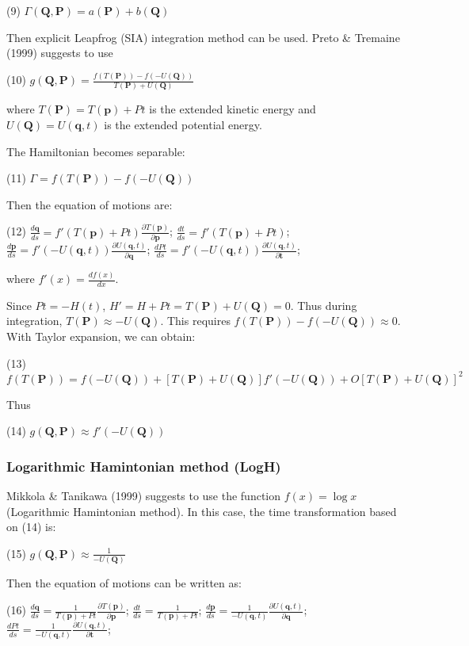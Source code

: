 (9) $ \Gamma(\mathbf{Q},\mathbf{P}) = a(\mathbf{P}) + b(\mathbf{Q}) $

Then explicit Leapfrog (S\+IA) integration method can be used. Preto \& Tremaine (1999) suggests to use

(10) $ g(\mathbf{Q},\mathbf{P}) = \frac{f(T(\mathbf{P})) - f(-U(\mathbf{Q}))}{T(\mathbf{P}) + U(\mathbf{Q})} $

where $ T(\mathbf{P}) = T(\mathbf{p}) + Pt $ is the extended kinetic energy and $ U(\mathbf{Q}) = U(\mathbf{q},t) $ is the extended potential energy.

The Hamiltonian becomes separable\+:

(11) $ \Gamma = f(T(\mathbf{P})) - f(-U(\mathbf{Q})) $

Then the equation of motions are\+:

(12) $ \frac{d \mathbf{q} }{d s} = f'(T(\mathbf{p})+Pt) \frac{\partial T(\mathbf{p})}{\partial {\mathbf{p}}} $; $ \frac{d t }{d s} = f'(T(\mathbf{p})+Pt) $; $ \frac{d \mathbf{p} }{d s} = f'(-U(\mathbf{q},t)) \frac{\partial U(\mathbf{q},t)}{\partial {\mathbf{q}}} $; $ \frac{d Pt}{d s} = f'(-U(\mathbf{q},t)) \frac{\partial U(\mathbf{q},t)}{\partial {\mathbf{t}}} $;

where $ f'(x) = \frac{d f(x)}{d x} $.

Since $Pt = -H(t)$, $H'=H+Pt = T(\mathbf{P}) + U(\mathbf{Q}) = 0 $. Thus during integration, $T(\mathbf{P}) \approx -U(\mathbf{Q}) $. This requires $ f(T(\mathbf{P})) - f(-U(\mathbf{Q})) \approx 0 $. With Taylor expansion, we can obtain\+:

(13) $ f(T(\mathbf{P})) = f(-U(\mathbf{Q})) + \left[T(\mathbf{P}) + U(\mathbf{Q})\right] f'(-U(\mathbf{Q})) + O\left[T(\mathbf{P}) + U(\mathbf{Q})\right]^2 $

Thus

(14) $ g(\mathbf{Q},\mathbf{P}) \approx f'(-U(\mathbf{Q})) $\hypertarget{index_logH_sec}{}\subsubsection{Logarithmic Hamintonian method (\+Log\+H)}\label{index_logH_sec}
Mikkola \& Tanikawa (1999) suggests to use the function $ f(x) = \log{x} $ (Logarithmic Hamintonian method). In this case, the time transformation based on (14) is\+:

(15) $ g(\mathbf{Q},\mathbf{P}) \approx \frac{1}{-U(\mathbf{Q})} $

Then the equation of motions can be written as\+:

(16) $ \frac{d \mathbf{q} }{d s} = \frac{1}{T(\mathbf{p})+Pt} \frac{\partial T(\mathbf{p})}{\partial {\mathbf{p}}} $; $ \frac{d t }{d s} = \frac{1}{T(\mathbf{p})+Pt} $; $ \frac{d \mathbf{p} }{d s} = \frac{1}{-U(\mathbf{q},t)} \frac{\partial U(\mathbf{q},t)}{\partial {\mathbf{q}}} $; $ \frac{d Pt}{d s} = \frac{1}{-U(\mathbf{q},t)} \frac{\partial U(\mathbf{q},t)}{\partial {\mathbf{t}}} $;

